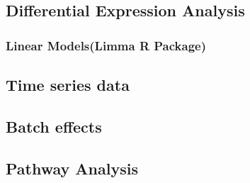 \subsection{Differential Expression Analysis}
\subsubsection{Linear Models(Limma R Package)}
\subsection{Time series data}
\subsection{Batch effects}
\subsection{Pathway Analysis}